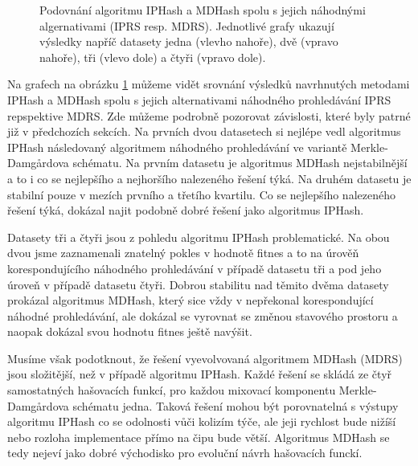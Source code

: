 \begin{figure}[!ht]
	\caption{Podovnání algoritmu IPHash a MDHash spolu s jejich náhodnými algernativami (IPRS resp. MDRS). Jednotlivé grafy ukazují výsledky napříč datasety
		jedna (vlevho nahoře), dvě (vpravo nahoře), tři (vlevo dole) a čtyři (vpravo dole).}
	\label{fig:conclusion_boxplot_1}
\end{figure}

Na grafech na obrázku \ref{fig:conclusion_boxplot_1} můžeme vidět srovnání výsledků navrhnutých metodami IPHash a MDHash spolu s jejich alternativami náhodného prohledávání
IPRS repspektive MDRS. Zde můžeme podrobně pozorovat závislosti, které byly patrné již v předchozích sekcích. Na prvních dvou datasetech si nejlépe vedl
algoritmus IPHash následovaný algoritmem náhodného prohledávání ve variantě Merkle-Damg\r{a}rdova schématu. Na prvním datasetu je algoritmus MDHash
nejstabilnější a to i co se nejlepšího a nejhoršího nalezeného řešení týká. Na druhém datasetu je stabilní pouze v mezích prvního a třetího kvartilu. Co se nejlepšího
nalezeného řešení týká, dokázal najit podobně dobré řešení jako algoritmus IPHash.

Datasety tři a čtyři jsou z pohledu algoritmu IPHash problematické. Na obou dvou jsme zaznamenali znatelný pokles v hodnotě fitnes a to na úrověň korespondujícího
náhodného prohledávání v případě datasetu tři a pod jeho úroveň v případě datasetu čtyři. Dobrou stabilitu nad těmito dvěma datasety prokázal algoritmus MDHash, který
sice vždy v nepřekonal korespondující náhodné prohledávání, ale dokázal se vyrovnat se změnou stavového prostoru a naopak dokázal svou hodnotu fitnes ještě navýšit. 

Musíme však podotknout, že řešení vyevolvovaná algoritmem MDHash (MDRS) jsou složitější, než v případě algoritmu IPHash. Každé řešení se skládá ze čtyř samostatných
hašovacích funkcí, pro každou mixovací komponentu Merkle-Damg\r{a}rdova schématu jedna. Taková řešení mohou být porovnatelná s výstupy algoritmu IPHash co se
odolnosti vůči kolizím týče, ale jeji rychlost  bude nižíší nebo rozloha implementace přímo na čipu bude větší. Algoritmus MDHash se tedy nejeví jako dobré východisko pro
evoluční návrh hašovacích funckí. 

